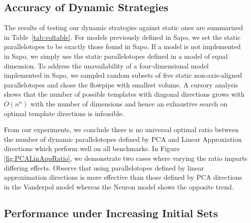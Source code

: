 \subsection{Accuracy of Dynamic Strategies}
\label{sec:dynamic_accuracy}
The results of testing our dynamic strategies against static ones are summarized in Table~\ref{tab:voltable}. For models previously defined in Sapo, we set the static parallelotopes to be exactly those found in Sapo.
If a model is not implemented in Sapo, we simply use the static parallelotopes defined in a model of equal dimension. To address the unavailability of a four-dimensional model implemented in Sapo, we sampled random subsets of five static non-axis-aligned parallelotopes and chose the flowpipe with smallest volume.
%
%
A cursory analysis shows that the number of possible templates with diagonal directions grows with $O(n^n)$ with the number of dimensions and hence an exhaustive search on optimal template directions is infeasible.


From our experiments, we conclude there is no universal optimal ratio between the number of dynamic parallelotopes defined by PCA and Linear Approxiation directions which perform well on all benchmarks. In Figure \ref{fig:PCALinAppRatio}, we demonstrate two cases where varying the ratio imparts differing effects. Observe that using parallelotopes defined by linear approximation directions is more effective than those defined by PCA directions in the Vanderpol model whereas the Neuron model shows the opposite trend.

%

%


\subsection{Performance under Increasing Initial Sets}
\label{sec:increasing_initial}


